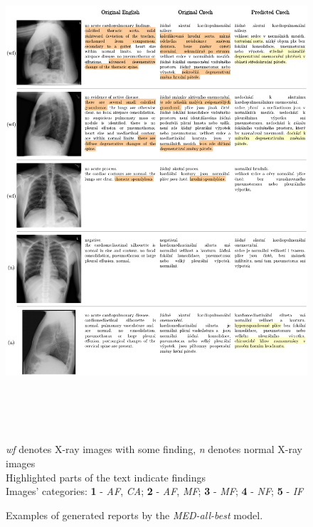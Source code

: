 \begin{figure}[h]\centering
\includegraphics[width=145mm, height=177.5mm]{../img/Examples1}
\caption{Examples of generated reports by the \textit{MED-all-best} model.}
\label{fig01:Examples1}
\textit{wf} denotes X-ray images with some finding, \textit{n} denotes normal X-ray images\\
Highlighted parts of the text indicate findings\\
Images' categories:
\textbf{1} - \textit{AF}, \textit{CA};
\textbf{2} - \textit{AF}, \textit{MF};
\textbf{3} - \textit{MF};
\textbf{4} - \textit{NF};
\textbf{5} - \textit{IF}
\end{figure}

